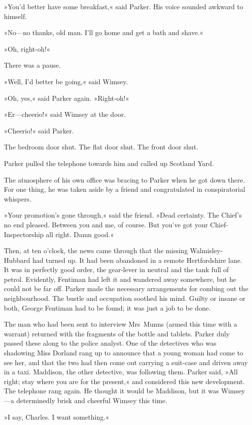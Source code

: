 »You'd better have some breakfast,« said Parker. His voice sounded awkward to himself.

»No—no thanks, old man. I'll go home and get a bath and shave.«

»Oh, right-oh!«

There was a pause.

»Well, I'd better be going,« said Wimsey.

»Oh, yes,« said Parker again. »Right-oh!«

»Er—cheerio!« said Wimsey at the door.

»Cheerio!« said Parker.

The bedroom door shut. The flat door shut. The front door shut.

Parker pulled the telephone towards him and called up Scotland Yard.

The atmosphere of his own office was bracing to Parker when he got down there. For one thing, he was taken aside by a friend and congratulated in conspiratorial whispers.

»Your promotion's gone through,« said the friend. »Dead certainty. The Chief's no end pleased. Between you and me, of course. But you've got your Chief-Inspectorship all right. Damn good.«

Then, at ten o'clock, the news came through that the missing Walmisley-Hubbard had turned up. It had been abandoned in a remote Hertfordshire lane. It was in perfectly good order, the gear-lever in neutral and the tank full of petrol. Evidently, Fentiman had left it and wandered away somewhere, but he could not be far off. Parker made the necessary arrangements for combing out the neighbourhood. The bustle and occupation soothed his mind. Guilty or insane or both, George Fentiman had to be found; it was just a job to be done.

The man who had been sent to interview Mrs~Munns (armed this time with a warrant) returned with the fragments of the bottle and tablets. Parker duly passed these along to the police analyst. One of the detectives who was shadowing Miss Dorland rang up to announce that a young woman had come to see her, and that the two had then come out carrying a suit-case and driven away in a taxi. Maddison, the other detective, was following them. Parker said, »All right; stay where you are for the present,« and considered this new development. The telephone rang again. He thought it would be Maddison, but it was Wimsey—a determinedly brisk and cheerful Wimsey this time.

»I say, Charles. I want something.«

